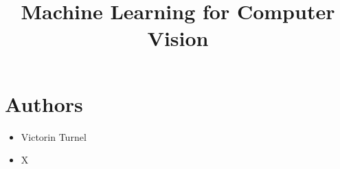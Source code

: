 \documentclass[conference]{IEEEtran}
\title{Machine Learning for Computer Vision}
\begin{document}
	\maketitle
	

	
	\section*{Authors}
	\begin{itemize}
		\item Victorin Turnel
		\item X
	\end{itemize}
	\vspace{0.5cm}
	
	
	\clearpage
	
	\clearpage
	
	\clearpage
	
	\clearpage
	
	
\end{document}
